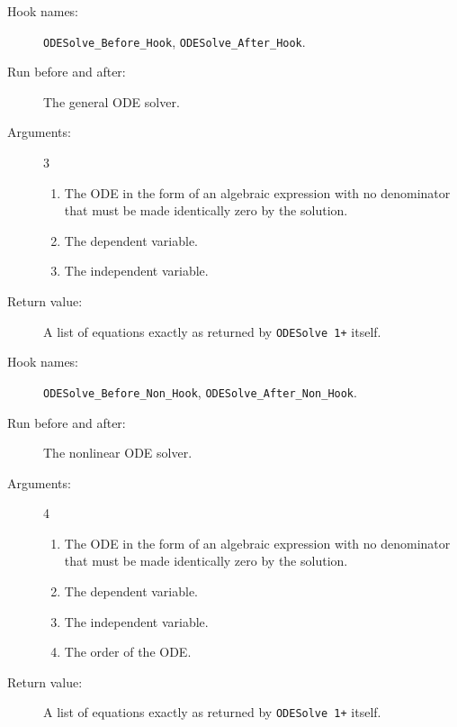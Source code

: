 \documentclass[a4paper]{article} %
\newcommand{\ODESolve}[1]{\texttt{ODESolve\,#1}}
\begin{document}
\noindent\hrulefill

\begin{description}
\item[Hook names:] \verb|ODESolve_Before_Hook|,
\verb|ODESolve_After_Hook|.
\item[Run before and after:] The general ODE solver.
\item[Arguments:] 3
\begin{enumerate}
\item The ODE in the form of an algebraic expression with no
denominator that must be made identically zero by the solution.
\item The dependent variable.
\item The independent variable.
\end{enumerate}
\item[Return value:] A list of equations exactly as returned by
\ODESolve{1+} itself.
\end{description}

\noindent\hrulefill

\begin{description}
\item[Hook names:] \verb|ODESolve_Before_Non_Hook|,
\verb|ODESolve_After_Non_Hook|.
\item[Run before and after:] The nonlinear ODE solver.
\item[Arguments:] 4
\begin{enumerate}
\item The ODE in the form of an algebraic expression with no
denominator that must be made identically zero by the solution.
\item The dependent variable.
\item The independent variable.
\item The order of the ODE.
\end{enumerate}
\item[Return value:] A list of equations exactly as returned by
\ODESolve{1+} itself.
\end{description}

\noindent\hrulefill
\pagebreak
\end{document}
